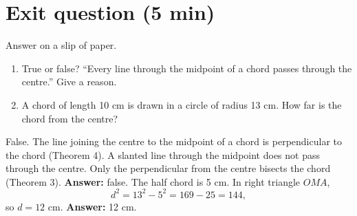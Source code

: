 \section{Exit question \normalfont\small(5 min)}

Answer on a slip of paper.

\begin{enumerate}[label=(\alph*),leftmargin=*]
\item True or false? ``Every line through the midpoint of a chord passes through the centre.'' Give a reason.
\item A chord of length 10 cm is drawn in a circle of radius 13 cm. How far is the chord from the centre?
\end{enumerate}

\begin{answerblock}
 False. The line joining the centre to the midpoint of a chord is perpendicular to the chord (Theorem 4). A slanted line through the midpoint does not pass through the centre. Only the perpendicular from the centre bisects the chord (Theorem 3). \textbf{Answer:} false.
 The half chord is 5 cm. In right triangle $OMA$,
\[ d^2 = 13^2 - 5^2 = 169 - 25 = 144, \]
so $d = 12$ cm. \textbf{Answer:} 12 cm.
\end{answerblock}
